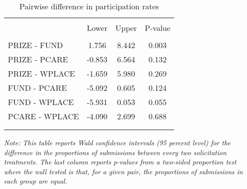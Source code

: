 \begin{table}
\centering
\caption{Pairwise difference in participation rates}
\label{pairwise}
\begin{tabular}{@{}lccc}
  \\[-1.8ex]\hline \hline \\[-1.8ex]
 & Lower & Upper & P-value \\ 
  \hline \\[-1.86ex]
PRIZE - FUND & 1.756 & 8.442 & 0.003 \\ 
  PRIZE - PCARE & -0.853 & 6.564 & 0.132 \\ 
  PRIZE - WPLACE & -1.659 & 5.980 & 0.269 \\ 
  FUND - PCARE & -5.092 & 0.605 & 0.124 \\ 
  FUND - WPLACE & -5.931 & 0.053 & 0.055 \\ 
  PCARE - WPLACE & -4.090 & 2.699 & 0.688 \\ 
   \\[-1.8ex]\hline \hline \\[-1.8ex]
\end{tabular}
\begin{minipage}{\textwidth}\itshape\footnotesize
Note: This table reports Wald confidence intervals (95 percent level) for the difference in the proportions of submissions between every two solicitation treatments. The last column reports p-values from a two-sided proportion test where the null tested is that, for a given pair, the proportions of submissions in each group are equal.
\end{minipage}
\end{table}

